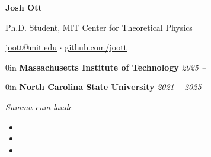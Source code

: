 \documentclass{cv}
\begin{document}
\begin{center}
    {\textbf{\LARGE Josh Ott}\par}

    \vspace{0.2em}

    Ph.D. Student, MIT Center for Theoretical Physics

    \href{mailto:joott@mit.edu}{joott@mit.edu} $\cdot$
    \href{https://www.github.com/joott}{github.com/joott}\\
\end{center}
\vspace{-0.6em}


\begin{adjustwidth}{\spacing}{0in}
    \textbf{Massachusetts Institute of Technology} \hfill \textsl{2025 --}

\end{adjustwidth}

\begin{adjustwidth}{\spacing}{0in}
    \textbf{North Carolina State University} \hfill \textsl{2021 -- 2025}


    \tabto{\bullet} \textit{Summa cum laude}
\end{adjustwidth}



\vspace{0.3em}


\vspace{-0.6em}

\begin{itemize}[leftmargin=1.3em]
    \item {}
    \item {}
    \item {}
\end{itemize}
\vspace{-0.3em}

\end{document}
